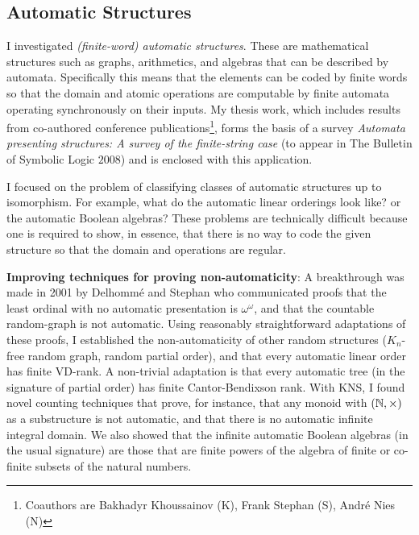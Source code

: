 \documentclass{article}
\theoremstyle{plain} \numberwithin{equation}{section}
\theoremstyle{definition}
\begin{document}
\thispagestyle{fancy}

\noindent

\begin{center} \subsection*{Automatic Structures}
\end{center}
\noindent

I investigated {\it (finite-word) automatic structures}. These are mathematical structures such as graphs, arithmetics, and algebras that can be described by automata. Specifically this means that the elements can be coded by finite words so that the domain and atomic operations are computable by finite automata operating synchronously on their inputs. My thesis work, which includes results from co-authored conference publications\footnote{Coauthors are Bakhadyr Khoussainov (K), Frank Stephan (S), Andr{\'e} Nies (N)},  forms the basis of a survey {\it Automata presenting structures: A survey of the finite-string case} (to appear in The Bulletin of Symbolic Logic $2008$) and is enclosed with this application.

I focused on the problem of classifying classes of automatic structures up to isomorphism. For example, what do the automatic linear orderings look like? or the automatic Boolean algebras? These problems are technically difficult because one is required to show, in essence, that there is no way to code the given structure so that the domain and operations are regular.


{\bf Improving techniques for proving non-automaticity}: A breakthrough was made in 2001 by Delhomm{\'e} and Stephan who communicated proofs that the least ordinal with no automatic presentation is $\omega^\omega$, and that the countable random-graph is not automatic. Using reasonably straightforward adaptations of these proofs, I established the non-automaticity of other random structures ($K_n$-free random graph, random partial order), and that every automatic linear order has finite VD-rank. A non-trivial adaptation is that every automatic tree (in the signature of partial order) has finite Cantor-Bendixson rank. With KNS, I found novel counting techniques that prove, for instance, that any monoid with $({\mathbb N},\times)$ as a substructure is not automatic, and that there is no automatic infinite integral domain. We also showed that the infinite automatic Boolean algebras (in the usual signature) are those that are finite powers of the algebra of finite or co-finite subsets of the natural numbers.
\end{document}
